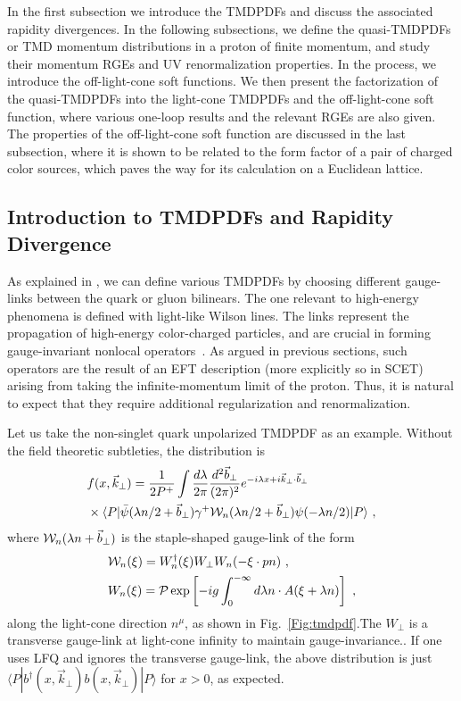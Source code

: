 In the first subsection we introduce the TMDPDFs and discuss the associated rapidity divergences. In the following subsections, we define the quasi-TMDPDFs or TMD momentum distributions in a proton of finite momentum,
and study their momentum RGEs and UV renormalization properties. In the process,
we introduce the off-light-cone soft functions. We then present the factorization of the quasi-TMDPDFs into the light-cone TMDPDFs and the off-light-cone soft function, where various one-loop results and the relevant RGEs are also given.
The properties of the off-light-cone soft function are discussed in the last subsection, where it is shown to be related to
the form factor of a pair of charged color sources, which paves the way for its calculation on a Euclidean lattice.

\subsection{Introduction to TMDPDFs and Rapidity Divergence}
\label{sec:lightconetmd}

As explained in , we can define various TMDPDFs by choosing different
gauge-links between the quark or gluon bilinears. The one relevant to high-energy phenomena is defined with
light-like Wilson lines. The links represent the propagation of high-energy color-charged particles, and are crucial in forming gauge-invariant nonlocal operators~\cite{Belitsky:2002sm}. As argued in previous sections, such
operators are the result of an EFT description (more explicitly so in SCET) arising from
taking the infinite-momentum limit of the proton. Thus, it is natural to expect that they require additional regularization and renormalization.

Let us take the non-singlet quark unpolarized TMDPDF as an example.
Without the field theoretic subtleties, the distribution is
\begin{align}\label{eq:beam}
	& f(x,\vec{k}_\perp) = \frac{1}{2P^+}\int\frac{d\lambda}{2\pi}\frac{d^2\vec{b}_\perp}{(2\pi)^2}
	e^{-i\lambda x+i\vec{k}_\perp \cdot \vec{b}_\perp}\\
	& \times \langle P| \bar \psi(\lambda n/2 +\vec{b}_\perp)\gamma^+{\cal W}_n(\lambda n/2+\vec{b}_\perp)\psi(-\lambda n/2)|P\rangle  \ ,\nonumber
\end{align}
where ${\cal W}_n(\lambda n+\vec{b}_\perp)$ is the staple-shaped gauge-link of the form
\begin{align}
	&{\cal W}_n(\xi)=W^{\dagger}_{n}(\xi)W_{\perp}W_{n}(-\xi \cdot p n) \label{eq:staplen} \ , \\
	&W_{n}(\xi)= {\cal P}\exp\left[-ig\int_{0}^{-\infty} d\lambda n\cdot A(\xi+\lambda n)\right] \ ,
\end{align}
along the light-cone direction $n^\mu$, as shown in Fig.~\ref{Fig:tmdpdf}.The $W_\perp$ is a transverse gauge-link at light-cone infinity to maintain gauge-invariance..
If one uses LFQ and ignores the transverse gauge-link, the above distribution
is just $\langle P|b^\dagger (x,\vec{k}_\perp)b(x,\vec{k}_\perp)|P\rangle$ for $x>0$, as expected.


